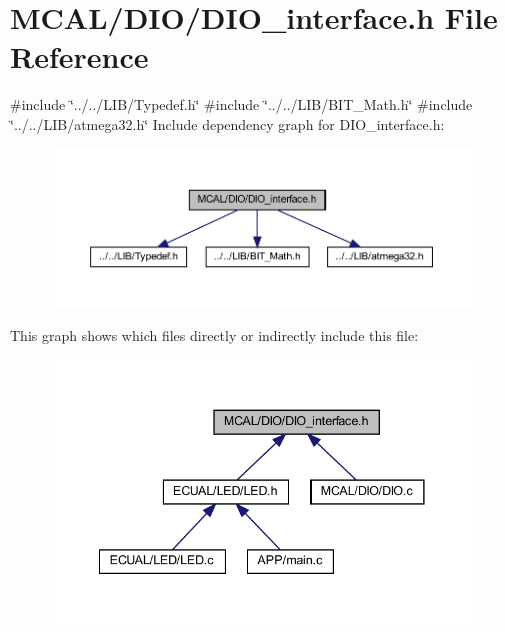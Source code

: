\section{M\+C\+A\+L/\+D\+I\+O/\+D\+I\+O\+\_\+interface.h File Reference}
\label{_d_i_o__interface_8h}
{\ttfamily \#include \char`\"{}../../\+L\+I\+B/\+Typedef.\+h\char`\"{}}\newline
{\ttfamily \#include \char`\"{}../../\+L\+I\+B/\+B\+I\+T\+\_\+\+Math.\+h\char`\"{}}\newline
{\ttfamily \#include \char`\"{}../../\+L\+I\+B/atmega32.\+h\char`\"{}}\newline
Include dependency graph for D\+I\+O\+\_\+interface.\+h\+:\nopagebreak
\begin{figure}[H]
\begin{center}
\leavevmode
\includegraphics[width=350pt]{_d_i_o__interface_8h__incl}
\end{center}
\end{figure}
This graph shows which files directly or indirectly include this file\+:\nopagebreak
\begin{figure}[H]
\begin{center}
\leavevmode
\includegraphics[width=341pt]{_d_i_o__interface_8h__dep__incl}
\end{center}
\end{figure}
